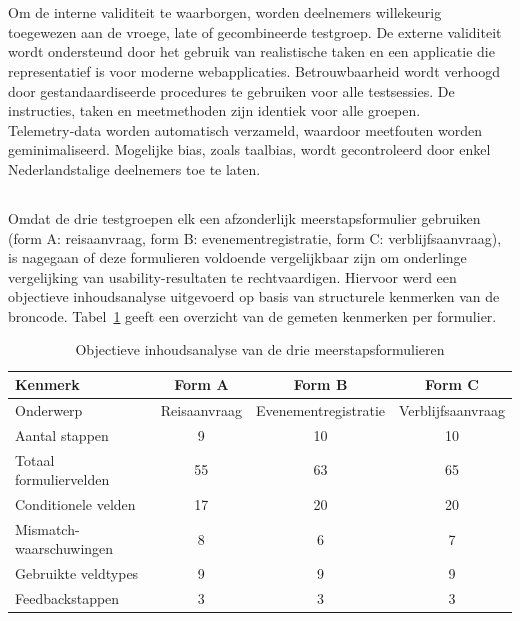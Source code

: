 \section{}
Om de interne validiteit te waarborgen, worden deelnemers willekeurig toegewezen aan de vroege, late of gecombineerde testgroep. De externe validiteit wordt ondersteund door het gebruik van realistische taken en een applicatie die representatief is voor moderne webapplicaties.
Betrouwbaarheid wordt verhoogd door gestandaardiseerde procedures te gebruiken voor alle testsessies. De instructies, taken en meetmethoden zijn identiek voor alle groepen. Telemetry‑data worden automatisch verzameld, waardoor meetfouten worden geminimaliseerd. Mogelijke bias, zoals taalbias, wordt gecontroleerd door enkel Nederlandstalige deelnemers toe te laten.

\subsection{}

Omdat de drie testgroepen elk een afzonderlijk meerstapsformulier gebruiken (form A: reisaanvraag, form B: evenementregistratie, form C: verblijfsaanvraag), is nagegaan of deze formulieren voldoende vergelijkbaar zijn om onderlinge vergelijking van usability-resultaten te rechtvaardigen. Hiervoor werd een objectieve inhoudsanalyse uitgevoerd op basis van structurele kenmerken van de broncode. Tabel~\ref{tab:form-equivalentie} geeft een overzicht van de gemeten kenmerken per formulier.

\begin{table}[h]
  \centering
  \caption[Structurele vergelijking van de drie formulieren]{Objectieve inhoudsanalyse van de drie meerstapsformulieren}
  \label{tab:form-equivalentie}
  \begin{tabular}{lccc}
    \hline
    \textbf{Kenmerk} & \textbf{Form A} & \textbf{Form B} & \textbf{Form C} \\
    \hline
    Onderwerp                        & Reisaanvraag     & Evenement\-registratie & Verblijfsaanvraag \\
    Aantal stappen                   & 9                & 10               & 10               \\
    Totaal formuliervelden           & 55               & 63               & 65               \\
    Conditionele velden              & 17               & 20               & 20               \\
    Mismatch-waarschuwingen          & 8                & 6                & 7                \\
    Gebruikte veldtypes              & 9                & 9                & 9                \\
    Feedbackstappen                  & 3                & 3                & 3                \\
    \hline
  \end{tabular}
\end{table}

